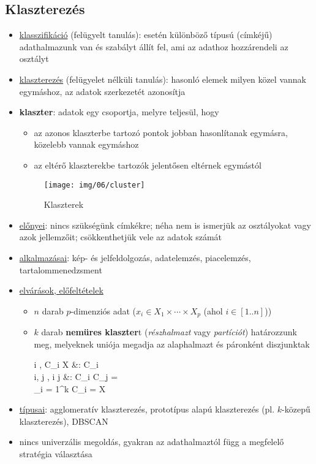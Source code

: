 \documentclass[a4paper, 11pt]{article}
\begin{document}
\subsection{Klaszterezés}

\begin{itemize}
	\item \underline{klasszifikáció} (felügyelt tanulás): esetén különböző típusú (címkéjű) adathalmazunk van és szabályt állít fel, ami  az adathoz hozzárendeli az osztályt
	\item \underline{klaszterezés} (felügyelet nélküli tanulás): hasonló elemek milyen közel vannak egymáshoz, az adatok szerkezetét azonosítja
	\item \textbf{klaszter}: adatok egy csoportja, melyre teljesül, hogy
	\begin{itemize}
		\item az azonos klaszterbe tartozó pontok jobban hasonlítanak egymásra, közelebb vannak egymáshoz
		\item az eltérő klaszterekbe tartozók jelentősen eltérnek egymástól
	\end{itemize}
	
	\begin{figure}[h!]
		\centering
		\texttt{[image: img/06/cluster]}
		\caption{Klaszterek}
	\end{figure}

	\item \underline{előnyei}: nincs szükségünk címkékre; néha nem is ismerjük az osztályokat vagy azok jellemzőit; csökkenthetjük vele az adatok számát
	\item \underline{alkalmazásai}: kép- és jelfeldolgozás, adatelemzés, piacelemzés, tartalommenedzsment
	\item \underline{elvárások, előfeltételek}
	\begin{itemize}
		\item $n$ darab $p$-dimenziós adat ($x_i \in X_1 \times \cdots \times X_p$ (ahol $i \in [1..n]$))
		\item $k$ darab \textbf{nemüres klaszter}t (\textit{részhalmazt} vagy \textit{partíciót}) határozzunk meg, melyeknek uniója megadja az alaphalmazt és páronként diszjunktak
		\begin{flalign*}
			\forall i \in [1..k], C_i \subseteq X &: C_i \neq \emptyset \\
			\forall i, j \in [1..k], i \neq j &: C_i \cap C_j = \emptyset \\
			\bigcup_{i = 1}^k C_i = X
		\end{flalign*}
	\end{itemize}
	\item \underline{típusai}: agglomeratív klaszterezés, prototípus alapú klaszterezés (pl. $k$-közepű klaszterezés), DBSCAN
	\item nincs univerzális megoldás, gyakran az adathalmaztól függ a megfelelő stratégia választása
	

\end{itemize}
\end{document}
